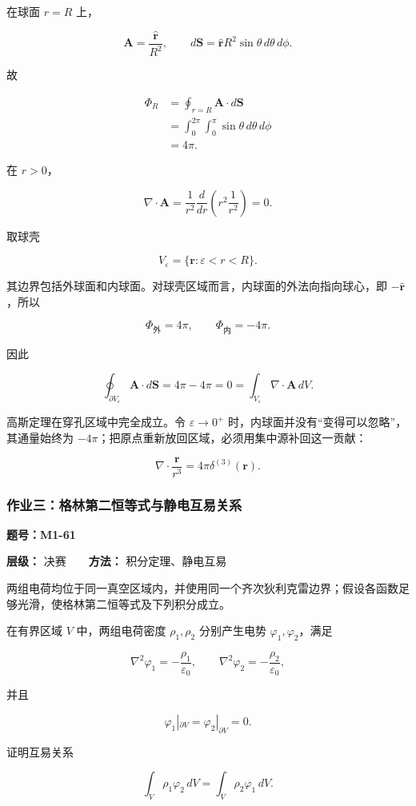 在球面 \(r=R\) 上，

\[
\mathbf A=\frac{\hat{\mathbf r}}{R^2},
\qquad
d\mathbf S
=\hat{\mathbf r}R^2\sin\theta\,d\theta\,d\phi.
\]

故

\[
\begin{aligned}
\Phi_R
&=
\oint_{r=R}\mathbf A\cdot d\mathbf S\\
&=
\int_0^{2\pi}\int_0^{\pi}
\sin\theta\,d\theta\,d\phi\\
&=
\boxed{4\pi}.
\end{aligned}
\]

在 \(r>0\)，

\[
\nabla\cdot\mathbf A
=
\frac1{r^2}\frac d{dr}
\left(
r^2\frac1{r^2}
\right)
=0.
\]

取球壳

\[
V_{\varepsilon}
=
\{\mathbf r:\varepsilon<r<R\}.
\]

其边界包括外球面和内球面。对球壳区域而言，内球面的外法向指向球心，即
\(-\hat{\mathbf r}\)，所以

\[
\Phi_{\mathrm{\text{外}}}=4\pi,
\qquad
\Phi_{\mathrm{\text{内}}}=-4\pi.
\]

因此

\[
\oint_{\partial V_{\varepsilon}}
\mathbf A\cdot d\mathbf S
=
4\pi-4\pi=0
=
\int_{V_{\varepsilon}}
\nabla\cdot\mathbf A\,dV.
\]

高斯定理在穿孔区域中完全成立。令 \(\varepsilon\to0^+\)
时，内球面并没有``变得可以忽略''，其通量始终为
\(-4\pi\)；把原点重新放回区域，必须用集中源补回这一贡献：

\[
\boxed{
\nabla\cdot\frac{\mathbf r}{r^3}
=
4\pi\delta^{(3)}(\mathbf r)
}.
\]

\par{}
\noindent\begin{minipage}{\linewidth}

\subsubsection{作业三：格林第二恒等式与静电互易关系}\label{m1:ux4f5cux4e1aux4e09ux683cux6797ux7b2cux4e8cux6052ux7b49ux5f0fux4e0eux9759ux7535ux4e92ux6613ux5173ux7cfb}

\textbf{题号：M1-61}

\textbf{层级：} 决赛　　\textbf{方法：} 积分定理、静电互易

两组电荷均位于同一真空区域内，并使用同一个齐次狄利克雷边界；假设各函数足够光滑，使格林第二恒等式及下列积分成立。

在有界区域 \(V\) 中，两组电荷密度 \(\rho_1,\rho_2\) 分别产生电势
\(\varphi_1,\varphi_2\)，满足

\[
\nabla^2\varphi_1=-\frac{\rho_1}{\varepsilon_0},
\qquad
\nabla^2\varphi_2=-\frac{\rho_2}{\varepsilon_0},
\]

并且

\[
\varphi_1|_{\partial V}
=
\varphi_2|_{\partial V}
=0.
\]

证明互易关系

\[
\boxed{
\int_V\rho_1\varphi_2\,dV
=
\int_V\rho_2\varphi_1\,dV
}.
\]


\end{minipage}\par


